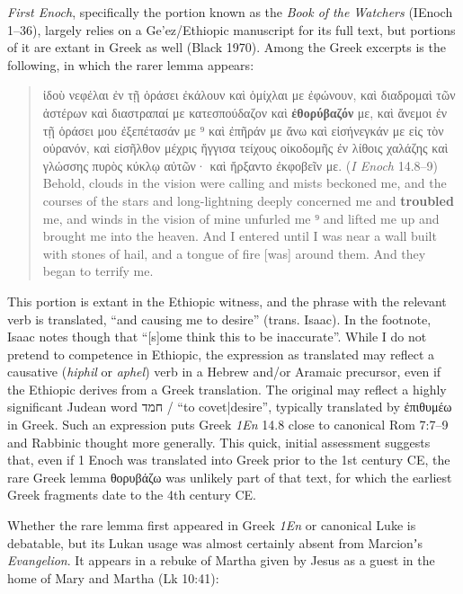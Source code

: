 \textit{First Enoch}, specifically the portion known as the \textit{Book of the Watchers} (IEnoch 1--36), %
largely relies on a Ge'ez/Ethiopic manuscript for its full text, %
but portions of it are extant in Greek as well (Black 1970). %
Among the Greek excerpts is the following, in which the rarer lemma appears: %

\vspace*{3mm} 
 \begin{quote}ἰδοὺ νεφέλαι ἐν τῇ ὁράσει
 ἐκάλουν καὶ ὁμίχλαι με ἐφώνουν, καὶ διαδρομαὶ τῶν ἀστέρων καὶ διαστραπαί
 με κατεσπούδαζον καὶ \textbf{ἐθορύβαζόν} με, καὶ ἄνεμοι ἐν τῇ ὁράσει μου ἐξεπέτασάν με %
 ⁹ καὶ ἐπῆράν με ἄνω καὶ εἰσήνεγκάν με εἰς τὸν οὐρανόν, καὶ εἰσῆλθον
 μέχρις ἤγγισα τείχους οἰκοδομῆς ἐν λίθοις χαλάζης καὶ γλώσσης πυρὸς
 κύκλῳ αὐτῶν· καὶ ἤρξαντο ἐκφοβεῖν με. (\textit{I Enoch} 14.8--9) \\[1mm] %
 Behold, clouds in the vision were calling and mists beckoned me, %
 and the courses of the stars and long-lightning %
 deeply concerned me and \textbf{troubled} me, and winds in the vision of mine unfurled me %
 ⁹ and lifted me up and brought me into the heaven. %
 And I entered until I was near a wall built with stones of hail, and a tongue of fire %
 [was] around them. And they began to terrify me. %
 \end{quote} %
 \vspace*{3mm}

This portion is extant in the Ethiopic witness, %
and the phrase with the relevant verb is translated, %
“and causing me to desire” (trans. Isaac). %
In the footnote, Isaac notes though that “[s]ome think this to be inaccurate”. %
While I do not pretend to competence in Ethiopic, %
the expression as translated may reflect a causative (\textit{hiphil} or \textit{aphel}) verb %
in a Hebrew and/or Aramaic precursor, %
even if the Ethiopic derives from a Greek translation. %
The original may reflect a highly significant Judean word \texthebrew{חמד} / “to covet|desire”, %
typically translated by ἐπιθυμέω in Greek. %
Such an expression puts Greek \textit{1En} 14.8 close to canonical Rom 7:7--9 and Rabbinic thought more generally. %
This quick, initial assessment suggests that, even if %
1 Enoch was translated into Greek prior to the 1st century CE, %
the rare Greek lemma θορυβάζω was unlikely part of that text, %
for which the earliest Greek fragments date to the 4th century CE. %

Whether the rare lemma first appeared in Greek \textit{1En} or canonical Luke is %
debatable, but its Lukan usage was almost %
certainly absent from Marcionʼs \textit{Evangelion}. %
It appears in a rebuke of Martha given by Jesus %
as a guest in the home of Mary and Martha (Lk 10:41): \clearpage

